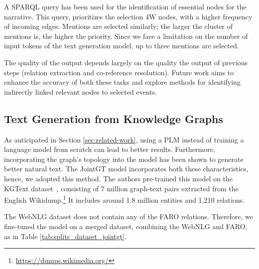 \documentclass[
hf, %
]{ceurart}
\begin{document}

A SPARQL query has been used for the identification of essential nodes for the narrative. This query, prioritizes the selection 4W nodes, with a higher frequency of incoming edges. Mentions are selected similarly; the larger the cluster of mentions is, the higher the priority. Since we face a limitation on the number of input tokens of the text generation model, up to three mentions are selected.

The quality of the output depends largely on the quality the output of previous steps (relation extraction and co-reference resolution). Future work aims to enhance the accuracy of both these tasks and explore methods for identifying indirectly linked relevant nodes to selected events.


\subsection{Text Generation from Knowledge Graphs}
As anticipated in Section \ref{sec:related-work}, using a PLM instead of training a language model from scratch can lead to better results. Furthermore, incorporating the graph's topology into the model has been shown to generate better natural text. The JointGT model \cite{JointGT} incorporates both these characteristics, hence, we adopted this method. The authors pre-trained this model on the KGText dataset~\cite{KGtext}, consisting of 7 million graph-text pairs extracted from the English Wikidump.\footnote{\url{https://dumps.wikimedia.org/}} It includes around 1.8 million entities and 1,210 relations.

The WebNLG dataset does not contain any of the FARO relations. Therefore, we fine-tuned the model on a merged dataset, combining the WebNLG and FARO, as in Table \ref{tab:splits_dataset_jointgt}.
\end{document}
